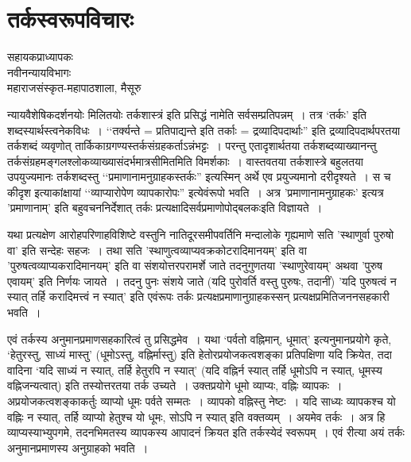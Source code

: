 {\fontsize{15}{17}\selectfont
\presetvalues
\chapter{तर्कस्वरूपविचारः}

\begin{center}
\smallskip

सहायकप्राध्यापकः\\
नवीनन्यायविभागः\\
महाराजसंस्कृत-महापाठशाला, मैसूरु
\addrule
\end{center}
न्यायवैशेषिकदर्शनयोः मिलितयोः तर्कशास्त्रं इति प्रसिद्धं नामेति सर्वसम्प्रतिपन्नम्~। तत्र \-‘तर्कः' इति शब्दस्यार्थस्त्वनेकविधः~। ‘‘तर्क्यन्ते = प्रतिपाद्यन्ते इति तर्काः = द्रव्यादिपदार्थाः'' इति द्रव्यादिपदार्थपरतया तर्कशब्दं व्यवृणोत् तार्किकाग्रगण्यस्तर्कसंग्रहकर्ताऽन्नंभट्टः~। परन्तु एतादृशार्थतया तर्कशब्दव्याख्यानन्तु तर्कसंग्रहमङ्गलश्लोकव्याख्यासंदर्भमात्र\-सीमितमिति विमर्शकाः~। वास्तवतया तर्कशास्त्रे बहुलतया उपयुज्यमानः तर्कशब्दस्तु \break ‘‘प्रमाणानामनुग्राहकस्तर्कः'' इत्यस्मिन् अर्थे एव प्रयुज्यमानो दरीदृश्यते~। स च कीदृश \break इत्याकांक्षायां ‘‘व्याप्यारोपेण व्यापकारोपः'' इत्येवंरूपो भवति~। अत्र 'प्रमाणानामनुग्राहकः' इत्यत्र 'प्रमाणानाम्' इति बहुवचननिर्देशात् तर्कः प्रत्यक्षादिसर्वप्रमाणोपोद्बलकः\break इति विज्ञायते~। 

यथा प्रत्यक्षेण आरोहपरिणाहविशिष्टे वस्तुनि नातिदूरसमीपवर्तिनि मन्दालोके गृह्यमाणे सति 'स्थाणुर्वा पुरुषो वा' इति सन्देहः सहजः~। तथा सति 'स्थाणुत्वव्याप्यवक्रकोटरादि\-मानयम्' इति वा 'पुरुषत्वव्याप्यकरादिमानयम्' इति वा संशयोत्तरपरामर्शे जाते तदनुगुणतया 'स्थाणुरेवायम्' अथवा 'पुरुष एवायम्' इति निर्णयः जायते~। तदनु पुनः संशये जाते (यदि पुरोवर्ति वस्तु पुरुषः, तदानीं) 'यदि पुरुषत्वं न स्यात् तर्हि करादिमत्त्वं न स्यात्' इति एवंरूपः तर्कः प्रत्यक्षप्रमाणानुग्राहकस्सन् प्रत्यक्षप्रमितिजननसहकारी भवति~। 

एवं तर्कस्य अनुमानप्रमाणसहकारित्वं तु प्रसिद्धमेव~। यथा ‘पर्वतो वह्निमान्, धूमात्' इत्यनुमानप्रयोगे कृते, ‘हेतुरस्तु, साध्यं मास्तु' (धूमोऽस्तु, वह्निर्मास्तु) इति हेतोरप्रयोजकत्वशङ्का प्रतिपक्षिणा यदि क्रियेत, तदा वादिना ‘यदि साध्यं न स्यात्, तर्हि हेतुरपि न स्यात्' (यदि वह्निर्न स्यात् तर्हि धूमोऽपि न स्यात्, धूमस्य वह्निजन्यत्वात्) इति तस्योत्तरतया तर्क उच्यते~। उक्तप्रयोगे धूमो व्याप्यः, वह्निः व्यापकः~। अप्रयोजकत्वशङ्काकर्तुः व्याप्यो धूमः पर्वते सम्मतः~। व्यापको वह्निस्तु नेष्टः~। यदि साध्यः व्यापकश्च यो वह्निः न स्यात्, तर्हि व्याप्यो हेतुश्च यो धूमः, सोऽपि न स्यात् इति वक्तव्यम्~। अयमेव तर्कः~। अत्र हि व्याप्यस्याभ्युपगमे, तदनभिमतस्य व्यापकस्य आपादनं क्रियत इति तर्कस्येदं स्वरूपम्~। एवं रीत्या अयं तर्कः अनुमानप्रमाणस्य अनुग्राहको भवति~। 

}
